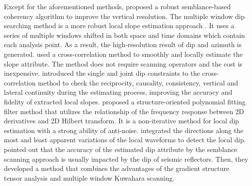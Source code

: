 Except for the aforementioned methods, \cite{1998Marfurt3} proposed a robust semblance-based coherency algorithm to improve the vertical resolution. 
The multiple window dip searching method is a more robust local slope estimation approach \cite{Kurt2006}. It uses a series of  multiple windows shifted in both space and time domains which contain each analysis point. As a result, the high-resolution  result of dip and azimuth is generated. \cite{2010Local} used a cross-correlation method to smoothly and locally estimate the slope attribute. The method does not require scanning operators and the cost is inexpensive. \cite{2013Consistent} introduced the single and joint dip constraints to the cross-correlation method to check the reciprocity, causality, consistency, vertical and lateral continuity during  the estimating process, improving the accuracy and fidelity of extracted local slopes. \cite{2015Seismicdip} proposed a structure-oriented polynomial fitting filter method that utilizes the relationship of the frequency response between 2D derivatives and 2D Hilbert transform. It is a non-iterative method for local dip estimation with a strong ability of anti-noise. \cite{Haibin2017} integrated the directions along the most and least apparent variations of the local waveforms to detect the local dip. \cite{2019Accurate} pointed out that the accuracy of the estimated dip attribute by the semblance scanning approach is usually impacted  by the dip of seismic reflectors. Then, they developed a method that combines the advantages of the gradient structure tensor analysis and multiple window Kuwahara scanning.

